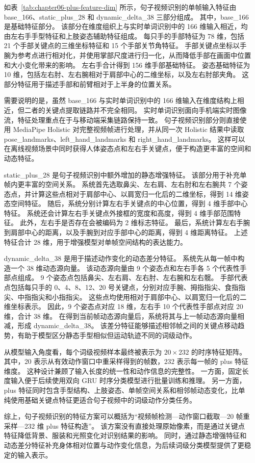 如表~\ref{tab:chapter06-plus-feature-dim} 所示，句子视频识别的单帧输入特征由 base\_166、static\_plus\_28 和 dynamic\_delta\_38 三部分组成。
其中，base\_166 是基础特征部分。
该部分在维度组织上与实时单词识别中的 166 维输入相近，均由左右手手型特征和上肢姿态辅助特征组成。
每只手的手部特征为 78 维，包括 21 个手部关键点的三维坐标特征和 15 个手部关节角特征。
手部关键点坐标以手腕为参考点进行相对化，并使用掌部尺度进行归一化，从而降低手部在画面中位置和大小变化带来的影响。
左右手合计得到 156 维手部基础特征。
姿态基础特征为 10 维，包括左右肘、左右腕相对于肩部中心的二维坐标，以及左右肘部夹角。
这部分特征用于描述手部和前臂相对于上半身的位置关系。

需要说明的是，虽然 base\_166 与实时单词识别中的 166 维输入在维度结构上相近，但二者的关键点提取链路并不完全相同。
实时单词识别面向手机端实时图像流，特征处理重点在于与移动端采集链路保持一致。
句子视频识别部分则直接使用 MediaPipe Holistic 对完整视频帧进行处理，并从同一次 Holistic 结果中读取 pose\_landmarks、left\_hand\_landmarks 和 right\_hand\_landmarks。
这样可以在离线视频场景中同时获得人体姿态点和左右手关键点，便于构造更丰富的空间和动态特征。

static\_plus\_28 是句子视频识别中额外增加的静态增强特征。
该部分用于补充单帧内更丰富的空间关系。
系统首先选取鼻尖、左右肩、左右肘和左右腕共 7 个姿态点，并计算这些点相对于肩部中心、以肩宽归一化后的二维坐标，得到 14 维姿态空间特征。
随后，系统分别计算左右手关键点的中心位置，得到 4 维手部中心特征。
系统还会计算左右手关键点外接框的宽度和高度，得到 4 维手部范围特征。
此外，左右手是否存在会被编码为 2 维标志特征。
最后，系统计算左右手腕到肩部中心的距离，以及手腕到对应手部中心的距离，得到 4 维距离特征。
上述特征合计 28 维，用于增强模型对单帧空间结构的表达能力。

dynamic\_delta\_38 是用于描述动作变化的动态差分特征。
系统先从每一帧中构造一个 38 维动态源向量。
该动态源向量由 9 个姿态点和左右手各 5 个代表性手部点组成。
9 个姿态点包括鼻尖、左右肩、左右肘、左右腕和左右髋。
手部代表点包括每只手的 0、4、8、12、20 号关键点，分别对应手腕、拇指指尖、食指指尖、中指指尖和小指指尖。
这些点均使用相对于肩部中心、以肩宽归一化后的二维坐标表示。
因此，9 个姿态点对应 18 维，左右手 10 个代表性手部点对应 20 维，合计 38 维。
在得到当前帧动态源向量后，系统将其与上一帧动态源向量相减，形成 dynamic\_delta\_38。
该差分特征能够描述相邻帧之间的关键点移动趋势，有助于模型区分静态手型相似但运动轨迹不同的词级动作。

从模型输入角度看，每个词级视频样本最终被表示为 $20\times232$ 的时序特征矩阵。
其中，20 表示从有效动作窗口中重采样得到的帧数，232 表示每一帧的 plus 特征维度。
这种设计兼顾了输入长度的统一性和动作信息的完整性。
一方面，固定长度输入便于后续使用双向 GRU 时序分类模型进行批量训练和推理。
另一方面，plus 特征同时包含手型结构、上肢姿态、单帧空间关系和相邻帧动态变化，比单纯使用基础关键点特征更适合句子视频中的词级动作分类任务。

综上，句子视频识别的特征方案可以概括为“视频帧检测—动作窗口截取—20 帧重采样—232 维 plus 特征构造”。
该方案没有直接处理原始像素，而是通过关键点特征降低背景、服装和光照变化对识别结果的影响。
同时，通过静态增强特征和动态差分特征补充身体相对位置与动作变化信息，为后续词级分类模型提供了更稳定的输入表示。